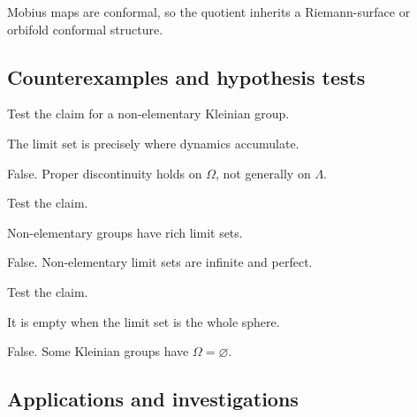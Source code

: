 \begin{solution}
Mobius maps are conformal, so the quotient inherits a Riemann-surface or orbifold conformal structure.
\end{solution}

\subsection*{Counterexamples and hypothesis tests}

\begin{exercise}\label{exr:vii37-ped-10}
Test the claim for a non-elementary Kleinian group.
\end{exercise}

\begin{hint}
The limit set is precisely where dynamics accumulate.
\end{hint}

\begin{solution}
False.  Proper discontinuity holds on \(\Omega\), not generally on \(\Lambda\).
\end{solution}

\begin{exercise}\label{exr:vii37-ped-11}
Test the claim.
\end{exercise}

\begin{hint}
Non-elementary groups have rich limit sets.
\end{hint}

\begin{solution}
False.  Non-elementary limit sets are infinite and perfect.
\end{solution}

\begin{exercise}\label{exr:vii37-ped-12}
Test the claim.
\end{exercise}

\begin{hint}
It is empty when the limit set is the whole sphere.
\end{hint}

\begin{solution}
False.  Some Kleinian groups have \(\Omega=\varnothing\).
\end{solution}

\subsection*{Applications and investigations}

